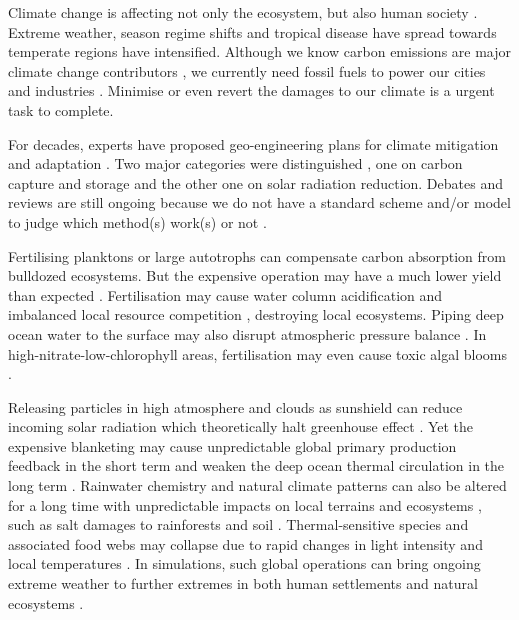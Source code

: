 \documentclass[../thesis.tex]{subfiles} %
\begin{document}
Climate change is affecting not only the ecosystem, but also human society \autocite{notz2016observed,schuur2015climate}.  Extreme weather, season regime shifts and tropical disease have spread towards temperate regions have intensified.  Although we know carbon emissions are major climate change contributors \autocite{notz2016observed}, we currently need fossil fuels to power our cities and industries \autocite{ferguson2000electricity}.  Minimise or even revert the damages to our climate is a urgent task to complete.

For decades, experts have proposed geo-engineering plans for climate mitigation and adaptation \autocite{farrelly2013carbon,yang2008progress,boyd2008ranking,boettcher2019high,vaughan2011review}.  Two major categories were distinguished \autocite{boyd2008ranking}, one on carbon capture and storage and the other one on solar radiation reduction.  Debates and reviews are still ongoing because we do not have a standard scheme and/or model to judge which method(s) work(s) or not \autocite{boyd2008ranking,boettcher2019high,boyd2016development,oschlies2017indicators,gattuso2018ocean}.

Fertilising planktons \autocite{gnanadesikan2008export,lovelock2007ocean,lawrence2014efficiency} or large autotrophs \autocite{duarte2017can,johannessen2016geoengineering,krause2016substantial} can compensate carbon absorption from bulldozed ecosystems.  But the expensive operation may have a much lower yield than expected \autocite{boyd2008implications,gnanadesikan2008export,oschlies2010side}.  Fertilisation may cause water column acidification \autocite{oschlies2010side} and imbalanced local resource competition \autocite{chung2011using,thiele2012microbial,batten2014did}, destroying local ecosystems.  Piping deep ocean water to the surface may also disrupt atmospheric pressure balance \autocite{kwiatkowski2015atmospheric}.  In high-nitrate-low-chlorophyll areas, fertilisation may even cause toxic algal blooms \autocite{trick2010iron}.

Releasing particles in high atmosphere and clouds as sunshield \autocite{latham2008global,stjern2018response,xia2016stratospheric} can reduce incoming solar radiation which theoretically halt greenhouse effect \autocite{williamson2012impacts}.  Yet the expensive blanketing \autocite{boyd2008implications} may cause unpredictable global primary production feedback in the short term and weaken the deep ocean thermal circulation in the long term \autocite{lauvset2017climate,williamson2012impacts}.  Rainwater chemistry and natural climate patterns can also be altered for a long time with unpredictable impacts on local terrains and ecosystems \autocite{bala2011albedo}, such as salt damages to rainforests and soil \autocite{muri2015tropical}.  Thermal-sensitive species and associated food webs may collapse due to rapid changes in light intensity and local temperatures \autocite{williamson2012impacts}.  In simulations, such global operations can bring ongoing extreme weather to further extremes in both human settlements and natural ecosystems \autocite{jones2009climate}.
\end{document}

